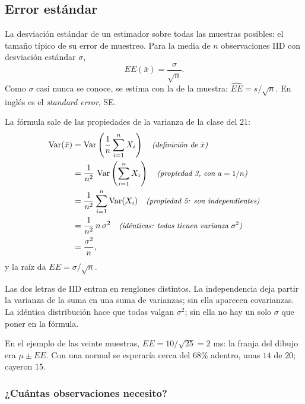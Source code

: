 \documentclass[11pt,letterpaper]{article}
\begin{document}

\subsection*{Error estándar}

\begin{definicion}
    La desviación estándar de un estimador sobre todas las muestras
    posibles: el tamaño típico de su error de muestreo. Para la media
    de $n$ observaciones IID con desviación estándar $\sigma$,
    \[
        EE(\bar{x}) = \frac{\sigma}{\sqrt{n}} .
    \]
    Como $\sigma$ casi nunca se conoce, se estima con la de la
    muestra: $\widehat{EE} = s / \sqrt{n}$. En inglés es el
    \emph{standard error}, SE.
\end{definicion}

La fórmula sale de las propiedades de la varianza de la clase del
$21$:
\begin{align*}
    \operatorname{Var}(\bar{x})
    &= \operatorname{Var}\left( \frac{1}{n} \sum_{i=1}^{n} X_i \right)
       \quad\text{\small\itshape (definición de $\bar{x}$)} \\
    &= \frac{1}{n^2}\, \operatorname{Var}\left( \sum_{i=1}^{n} X_i
       \right)
       \quad\text{\small\itshape (propiedad 3, con $a = 1/n$)} \\
    &= \frac{1}{n^2} \sum_{i=1}^{n} \operatorname{Var}(X_i)
       \quad\text{\small\itshape (propiedad 5: son independientes)} \\
    &= \frac{1}{n^2}\, n\, \sigma^2
       \quad\text{\small\itshape (idénticas: todas tienen varianza $\sigma^2$)} \\
    &= \frac{\sigma^2}{n} ,
\end{align*}
y la raíz da $EE = \sigma / \sqrt{n}$.

\begin{idea}
    Las dos letras de IID entran en renglones distintos. La
    independencia deja partir la varianza de la suma en una suma de
    varianzas; sin ella aparecen covarianzas. La idéntica distribución
    hace que todas valgan $\sigma^2$; sin ella no hay un solo $\sigma$
    que poner en la fórmula.
\end{idea}

En el ejemplo de las veinte muestras, $EE = 10 / \sqrt{25} = 2$ ms: la
franja del dibujo era $\mu \pm EE$. Con una normal se esperaría cerca
del $68\%$ adentro, unas $14$ de $20$; cayeron $15$.

\subsubsection*{¿Cuántas observaciones necesito?}
\end{document}
